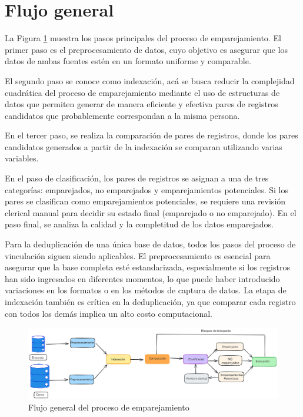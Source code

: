\documentclass[
  12pt,
]{book}
\begin{document}
\section{Flujo general}\label{flujo-general}

La Figura \ref{fig:match1} muestra los pasos principales del proceso de emparejamiento. El primer paso es el preprocesamiento de datos, cuyo objetivo es asegurar que los datos de ambas fuentes estén en un formato uniforme y comparable.

El segundo paso se conoce como indexación, acá se busca reducir la complejidad cuadrática del proceso de emparejamiento mediante el uso de estructuras de datos que permiten generar de manera eficiente y efectiva pares de registros candidatos que probablemente correspondan a la misma persona.

En el tercer paso, se realiza la comparación de pares de registros, donde los pares candidatos generados a partir de la indexación se comparan utilizando varias variables.

En el paso de clasificación, los pares de registros se asignan a una de tres categorías: emparejados, no emparejados y emparejamientos potenciales. Si los pares se clasifican como emparejamientos potenciales, se requiere una revisión clerical manual para decidir su estado final (emparejado o no emparejado). En el paso final, se analiza la calidad y la completitud de los datos emparejados.

Para la deduplicación de una única base de datos, todos los pasos del proceso de vinculación siguen siendo aplicables. El preprocesamiento es esencial para asegurar que la base completa esté estandarizada, especialmente si los registros han sido ingresados en diferentes momentos, lo que puede haber introducido variaciones en los formatos o en los métodos de captura de datos. La etapa de indexación también es crítica en la deduplicación, ya que comparar cada registro con todos los demás implica un alto costo computacional.

\begin{figure}

{\centering \includegraphics[width=1\linewidth]{images/FlujoMatch2} 

}

\caption{Flujo general del proceso de emparejamiento}\label{fig:match1}
\end{figure}
\end{document}
